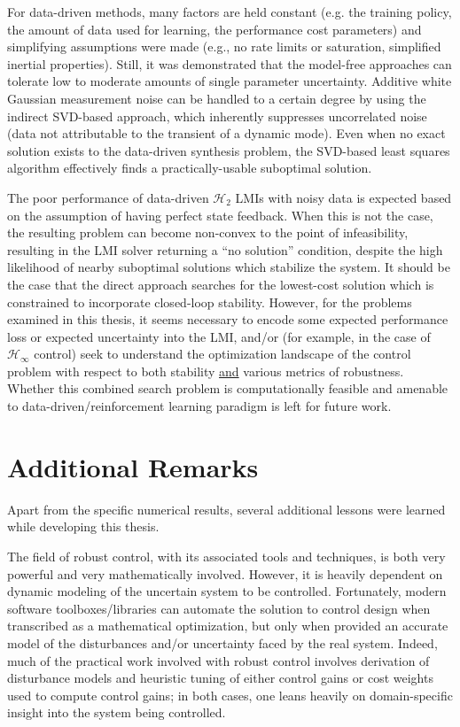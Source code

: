 For data-driven methods, many factors are held constant (e.g. the training policy, the amount of data used for learning, the performance cost parameters) and simplifying assumptions were made (e.g., no rate limits or saturation, simplified inertial properties).  Still, it was demonstrated that the model-free approaches can tolerate low to moderate amounts of single parameter uncertainty.  Additive white Gaussian measurement noise can be handled to a certain degree by using the indirect SVD-based approach, which inherently suppresses uncorrelated noise (data not attributable to the transient of a dynamic mode).  Even when no exact solution exists to the data-driven synthesis problem, the SVD-based least squares algorithm effectively finds a practically-usable suboptimal solution.

The poor performance of data-driven $\mathcal{H}_{2}$ LMIs with noisy data is expected based on the assumption of having perfect state feedback.  When this is not the case, the resulting problem can become non-convex to the point of infeasibility, resulting in the LMI solver returning a ``no solution'' condition, despite the high likelihood of nearby suboptimal solutions which stabilize the system.  It should be the case that the direct approach searches for the lowest-cost solution which is constrained to incorporate closed-loop stability.  However, for the problems examined in this thesis, it seems necessary to encode some expected performance loss or expected uncertainty into the LMI, and/or (for example, in the case of $\mathcal{H}_{\infty}$ control) seek to understand the optimization landscape of the control problem with respect to both stability \underline{and} various metrics of robustness.  Whether this combined search problem is computationally feasible and amenable to data-driven/reinforcement learning paradigm is left for future work.

\section{Additional Remarks}
Apart from the specific numerical results, several additional lessons were learned while developing this thesis.

The field of robust control, with its associated tools and techniques, is both very powerful and very mathematically involved.  However, it is heavily dependent on dynamic modeling of the uncertain system to be controlled.  Fortunately, modern software toolboxes/libraries can automate the solution to control design when transcribed as a mathematical optimization, but only when provided an accurate model of the disturbances and/or uncertainty faced by the real system.  Indeed, much of the practical work involved with robust control involves derivation of disturbance models and heuristic tuning of either control gains or cost weights used to compute control gains; in both cases, one leans heavily on domain-specific insight into the system being controlled.

